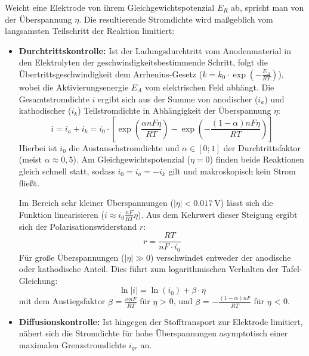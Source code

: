 \documentclass[11pt,a4paper]{article}
\numberwithin{equation}{section}
\begin{document}
\noindent Weicht eine Elektrode von ihrem Gleichgewichtspotenzial $E_R$ ab, spricht man von der Überspannung $\eta$. Die resultierende Stromdichte wird maßgeblich vom langsamsten Teilschritt der Reaktion limitiert:
\begin{itemize}
    \item \textbf{Durchtrittskontrolle:} Ist der Ladungsdurchtritt vom Anodenmaterial in den Elektrolyten der geschwindigkeitsbestimmende Schritt, folgt die Übertrittsgeschwindigkeit dem Arrhenius-Gesetz ($k = k_0 \cdot \exp(-\frac{E_A}{RT})$), wobei die Aktivierungsenergie $E_A$ vom elektrischen Feld abhängt. Die Gesamtstromdichte $i$ ergibt sich aus der Summe von anodischer ($i_a$) und kathodischer ($i_k$) Teilstromdichte in Abhängigkeit der Überspannung $\eta$:
    \begin{equation}
        i = i_a + i_k = i_0 \cdot \left[ \exp\left(\frac{\alpha n F \eta}{R T}\right) - \exp\left(-\frac{(1-\alpha) n F \eta}{R T}\right) \right]
        \label{eq:butlervolmer}
    \end{equation}
    Hierbei ist $i_0$ die Austauschstromdichte und $\alpha \in [0;1]$ der Durchtrittsfaktor (meist $\alpha \approx 0,5$). Am Gleichgewichtspotenzial ($\eta = 0$) finden beide Reaktionen gleich schnell statt, sodass $i_0 = i_a = -i_k$ gilt und makroskopisch kein Strom fließt.
    
\noindent Im Bereich sehr kleiner Überspannungen ($|\eta| < \qty{0,017}{\volt}$) lässt sich die Funktion linearisieren ($i \approx i_0 \frac{n F}{R T} \eta$). Aus dem Kehrwert dieser Steigung ergibt sich der Polarisationswiderstand $r$:
    \begin{equation}
        r = \frac{R T}{n F \cdot i_0}
        \label{eq:polwiderstand}
    \end{equation}
 \noindent Für große Überspannungen ($|\eta| \gg 0$) verschwindet entweder der anodische oder kathodische Anteil. Dies führt zum logarithmischen Verhalten der Tafel-Gleichung:
    \begin{equation}
        \ln|i| = \ln(i_0) + \beta \cdot \eta
        \label{eq:tafel}
    \end{equation}
\noindent mit dem  Anstiegsfaktor $\beta$ = $\frac{\alpha nF}{RT}$ f\"ur $\eta$ > 0, und $\beta$ = $-\frac{(1-\alpha) nF}{RT}$ f\"ur $\eta$ <  0.
    
    \item \textbf{Diffusionskontrolle:} Ist hingegen der Stofftransport zur Elektrode limitiert, nähert sich die Stromdichte für hohe Überspannungen asymptotisch einer maximalen Grenzstromdichte $i_{gr}$ an.
\end{itemize}
\end{document}
